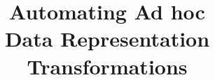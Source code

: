 \documentclass[runningheads,a4paper]{style/llncs}
\begin{document}
\mainmatter
\title{Automating Ad hoc \\Data Representation Transformations}
\author{}
\institute{}
\maketitle


% 









\renewcommand{\small}{\scriptsize}


\end{document}
